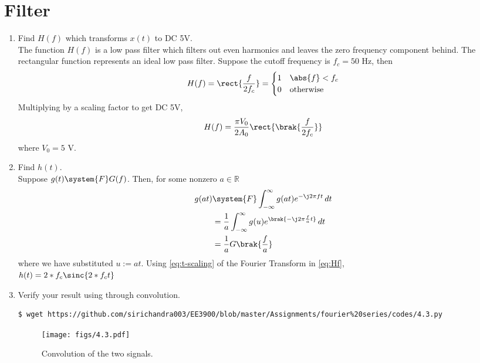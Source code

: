 \documentclass[journal,12pt,twocolumn]{IEEEtran}
\renewcommand\thesection{\arabic{section}}
\begin{document}
\section{Filter}
\begin{enumerate}[label=\thesection.\arabic*
,ref=\thesection.\theenumi]
\item Find $H(f)$ which transforms $x(t)$ to DC 5V.\\
\solution The function $H(f)$ is a low pass filter which filters out
even harmonics and leaves the zero frequency component behind.
The rectangular function represents an ideal low pass filter.
Suppose the cutoff frequency is $f_c = 50$ Hz, then
\begin{align}
H(f) = \rect{\frac{f}{2f_c}} =
\begin{cases}
1 & \abs{f} < f_c \\
0 & \textrm{otherwise}
\end{cases}
\label{eq:Hf}
\end{align}
Multiplying by a scaling factor to get DC 5V,
\begin{align}
H(f) = \frac{\pi V_0}{2A_0}\rect{\brak{\frac{f}{2f_c}}}
\end{align}
where $V_0 = 5$ V.
\item Find $h(t)$. \\
\solution Suppose $g(t)\system{F}G(f)$. Then, for some
nonzero $a \in \mathbb{R}$
\begin{align}
g(at)&\system{F}\int_{-\infty}^{\infty}g(at)e^{-\j2\pi ft}\, dt \\
&=\frac{1}{a}\int_{-\infty}^{\infty}g(u)e^{\brak{-\j2\pi \frac{f}{a}t}}\, dt \\
&=\frac{1}{a}G\brak{\frac{f}{a}}
\label{eq:t-scaling}
\end{align}
where we have substituted $u := at$. Using
\eqref{eq:t-scaling} of the Fourier Transform in \eqref{eq:Hf}, \\
$h(t) = 2*f_c \sinc{2*f_ct} $

\item Verify your result using through convolution. \\
\solution 
\begin{lstlisting}
$ wget https://github.com/sirichandra003/EE3900/blob/master/Assignments/fourier%20series/codes/4.3.py
\end{lstlisting}
\begin{figure}[!ht]
\texttt{[image: figs/4.3.pdf]}
\caption{Convolution of the two signals.}
\label{eq:fig-conv}
\end{figure}
\end{enumerate}
\end{document}
